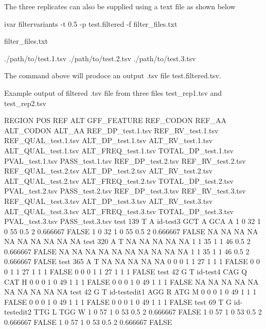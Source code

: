 The three replicates can also be supplied using a text file as shown below


\begin{DoxyCode}
ivar filtervariants -t 0.5 -p test.filtered -f filter\_files.txt
\end{DoxyCode}


filter\+\_\+files.\+txt


\begin{DoxyCode}
./path/to/test.1.tsv
./path/to/test.2.tsv
./path/to/test.3.tsv
\end{DoxyCode}


The command above will prodoce an output .tsv file test.\+filtered.\+tsv.

Example output of filtered .tsv file from three files test\+\_\+rep1.\+tsv and test\+\_\+rep2.\+tsv


\begin{DoxyCode}
REGION  POS REF ALT GFF\_FEATURE REF\_CODON   REF\_AA  ALT\_CODON   ALT\_AA  REF\_DP\_test.1.tsv  
       REF\_RV\_test.1.tsv   REF\_QUAL\_test.1.tsv ALT\_DP\_test.1.tsv   ALT\_RV\_test.1.tsv   ALT\_QUAL\_test.1.tsv ALT\_FREQ\_test.1.tsv
       TOTAL\_DP\_test.1.tsv PVAL\_test.1.tsv PASS\_test.1.tsv REF\_DP\_test.2.tsv   REF\_RV\_test.2.tsv   REF\_QUAL\_test.2.tsv
       ALT\_DP\_test.2.tsv   ALT\_RV\_test.2.tsv   ALT\_QUAL\_test.2.tsv ALT\_FREQ\_test.2.tsv TOTAL\_DP\_test.2.tsv
       PVAL\_test.2.tsv PASS\_test.2.tsv REF\_DP\_test.3.tsv   REF\_RV\_test.3.tsv   REF\_QUAL\_test.3.tsv ALT\_DP\_test.3.tsv  
       ALT\_RV\_test.3.tsv   ALT\_QUAL\_test.3.tsv ALT\_FREQ\_test.3.tsv TOTAL\_DP\_test.3.tsv PVAL\_test.3.tsv PASS\_test.3.tsv
test    139 T   A   id-test3    GCT A   GCA A   1   0   32  1   0   55  0.5 2   0.666667    FALSE   1   0  
       32  1   0   55  0.5 2   0.666667    FALSE   NA  NA  NA  NA  NA  NA  NA  NA  NA  NA
test    320 A   T   NA  NA  NA  NA  NA  1   1   35  1   1   46  0.5 2   0.666667    FALSE   NA  NA  NA  NA 
       NA  NA  NA  NA  NA  NA  1   1   35  1   1   46  0.5 2   0.666667    FALSE
test    365 A   T   NA  NA  NA  NA  NA  0   0   0   1   1   27  1   1   1   FALSE   0   0   0   1   1   27 
       1   1   1   FALSE   0   0   0   1   1   27  1   1   1   FALSE
test    42  G   T   id-test4    CAG Q   CAT H   0   0   0   1   0   49  1   1   1   FALSE   0   0   0   1  
       0   49  1   1   1   FALSE   NA  NA  NA  NA  NA  NA  NA  NA  NA  NA
test    42  G   T   id-testedit1    AGG R   ATG M   0   0   0   1   0   49  1   1   1   FALSE   0   0   0  
       1   0   49  1   1   1   FALSE   0   0   0   1   0   49  1   1   1   FALSE
test    69  T   G   id-testedit2    TTG L   TGG W   1   0   57  1   0   53  0.5 2   0.666667    FALSE   1  
       0   57  1   0   53  0.5 2   0.666667    FALSE   1   0   57  1   0   53  0.5 2   0.666667    FALSE
\end{DoxyCode}


